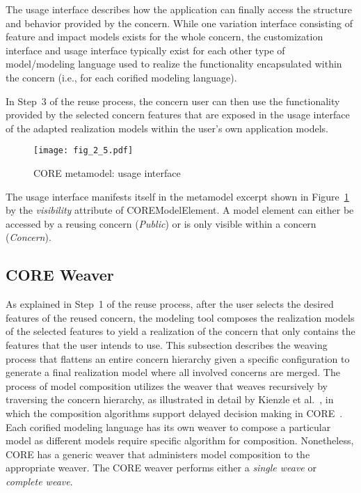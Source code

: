 The usage interface describes how the application can finally access the structure and behavior provided by the concern. While one variation interface consisting of feature and impact models exists for the whole concern, the customization interface and usage interface typically exist for each other type of model/modeling language used to realize the functionality encapsulated within the concern (i.e., for each corified modeling language).

In Step~3 of the reuse process, the concern user can then use the functionality provided by the selected concern features that are exposed in the usage interface of the adapted realization models within the user's own application models.

\begin{figure}
	\centering
	\texttt{[image: fig\_2\_5.pdf]}
	\caption{CORE metamodel: usage interface}
	\label{fig:2.5}
\end{figure}

The usage interface manifests itself in the metamodel excerpt shown in Figure~\ref{fig:2.5} by the \emph{visibility} attribute of {\cls COREModelElement}. A model element can either be accessed by a reusing concern (\emph{Public}) or is only visible within a concern (\emph{Concern}).

\subsection{CORE Weaver} \label{sec:2.1.2}

As explained in Step~1 of the reuse process, after the user selects the desired features of the reused concern, the modeling tool composes the realization models of the selected features to yield a realization of the concern that only contains the features that the user intends to use. This subsection describes the weaving process that flattens an entire concern hierarchy given a specific configuration to generate a final realization model where all involved concerns are merged. The process of model composition utilizes the weaver that weaves recursively by traversing the concern hierarchy, as illustrated in detail by Kienzle et al.~\cite{kienzle2009aspect}, in which the composition algorithms support delayed decision making in CORE~\cite{kienzle2016delaying}. Each corified modeling language has its own weaver to compose a particular model as different models require specific algorithm for composition. Nonetheless, CORE has a generic weaver that administers model composition to the appropriate weaver. The CORE weaver performs either a \emph{single weave} or \emph{complete weave}.

